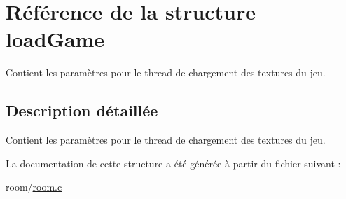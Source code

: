 \hypertarget{structload_game}{}\section{Référence de la structure load\+Game}
\label{structload_game}


Contient les paramètres pour le thread de chargement des textures du jeu.  




\subsection{Description détaillée}
Contient les paramètres pour le thread de chargement des textures du jeu. 

La documentation de cette structure a été générée à partir du fichier suivant \+:\begin{DoxyCompactItemize}
\item 
room/\hyperlink{room_8c}{room.\+c}\end{DoxyCompactItemize}
